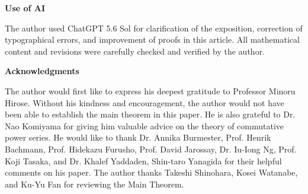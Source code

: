 \documentclass[15pt,oneside,reqno]{amsart}
\theoremstyle{remark}{
\newtheorem{lem}[df]{Lemma}
\newtheorem{prop}[df]{Proposition}
\newtheorem{ex}[df]{Example}
\newtheorem{rmk}[df]{Remark}
}
\begin{document}
\begin{center}

\textbf{Use of AI}

\end{center}

The author used ChatGPT 5.6 Sol for clarification of the exposition, correction of typographical errors, and improvement of proofs in this article. All mathematical content and revisions were carefully checked and verified by the author.


\begin{center}
\textbf{Acknowledgments}
\end{center}
The author would first like to express his deepest gratitude to Professor Minoru Hirose. Without his kindness and encouragement, the author would not have been able to establish the main theorem in this paper.  
He is also grateful to Dr. Nao Komiyama for giving him valuable advice on the theory of commutative power series.  
He would like to thank Dr. Annika Burmester, Prof. Henrik Bachmann, Prof. Hidekazu Furusho, Prof. David Jarossay, Dr. Iu-Iong Ng, Prof. Koji Tasaka, and Dr. Khalef Yaddaden, Shin-taro Yanagida for their helpful comments on his paper.
The author thanks Takeshi Shinohara, Kosei Watanabe, and Ku-Yu Fan for reviewing the Main Theorem.







\end{document}
